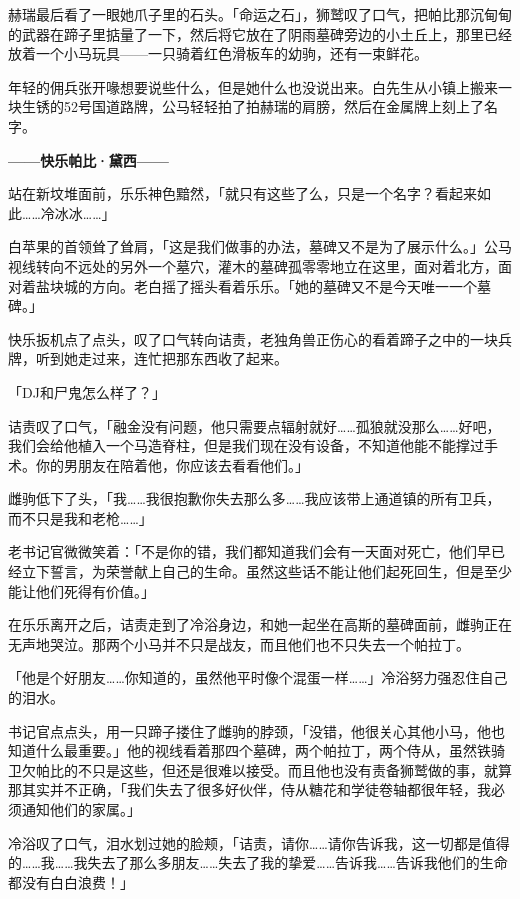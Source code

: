 赫瑞最后看了一眼她爪子里的石头。「命运之石」，狮鹫叹了口气，把帕比那沉甸甸的武器在蹄子里掂量了一下，然后将它放在了阴雨墓碑旁边的小土丘上，那里已经放着一个小马玩具——一只骑着红色滑板车的幼驹，还有一束鲜花。

年轻的佣兵张开喙想要说些什么，但是她什么也没说出来。白先生从小镇上搬来一块生锈的52号国道路牌，公马轻轻拍了拍赫瑞的肩膀，然后在金属牌上刻上了名字。

\begin{center}
    \textbf{——快乐帕比·黛西——}
\end{center}

站在新坟堆面前，乐乐神色黯然，「就只有这些了么，只是一个名字？看起来如此……冷冰冰……」

白苹果的首领耸了耸肩，「这是我们做事的办法，墓碑又不是为了展示什么。」公马视线转向不远处的另外一个墓穴，灌木的墓碑孤零零地立在这里，面对着北方，面对着盐块城的方向。老白摇了摇头看着乐乐。「她的墓碑又不是今天唯一一个墓碑。」

快乐扳机点了点头，叹了口气转向诘责，老独角兽正伤心的看着蹄子之中的一块兵牌，听到她走过来，连忙把那东西收了起来。

「DJ和尸鬼怎么样了？」

诘责叹了口气，「融金没有问题，他只需要点辐射就好……孤狼就没那么……好吧，我们会给他植入一个马造脊柱，但是我们现在没有设备，不知道他能不能撑过手术。你的男朋友在陪着他，你应该去看看他们。」

雌驹低下了头，「我……我很抱歉你失去那么多……我应该带上通道镇的所有卫兵，而不只是我和老枪……」

老书记官微微笑着：「不是你的错，我们都知道我们会有一天面对死亡，他们早已经立下誓言，为荣誉献上自己的生命。虽然这些话不能让他们起死回生，但是至少能让他们死得有价值。」

在乐乐离开之后，诘责走到了冷浴身边，和她一起坐在高斯的墓碑面前，雌驹正在无声地哭泣。那两个小马并不只是战友，而且他们也不只失去一个帕拉丁。

「他是个好朋友……你知道的，虽然他平时像个混蛋一样……」冷浴努力强忍住自己的泪水。

书记官点点头，用一只蹄子搂住了雌驹的脖颈，「没错，他很关心其他小马，他也知道什么最重要。」他的视线看着那四个墓碑，两个帕拉丁，两个侍从，虽然铁骑卫欠帕比的不只是这些，但还是很难以接受。而且他也没有责备狮鹫做的事，就算那其实并不正确，「我们失去了很多好伙伴，侍从糖花和学徒卷轴都很年轻，我必须通知他们的家属。」

冷浴叹了口气，泪水划过她的脸颊，「诘责，请你……请你告诉我，这一切都是值得的……我……我失去了那么多朋友……失去了我的挚爱……告诉我……告诉我他们的生命都没有白白浪费！」

